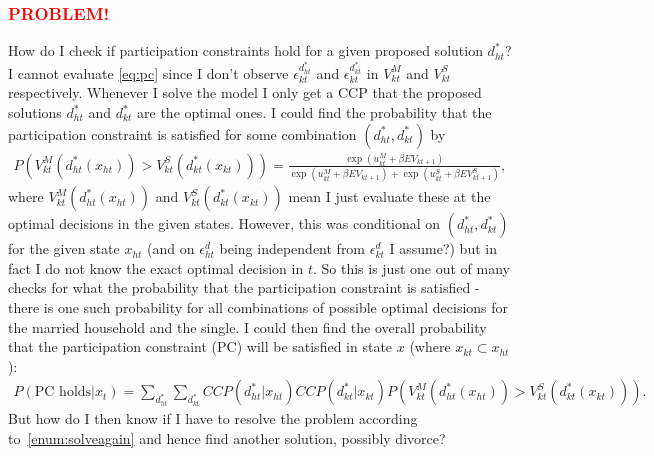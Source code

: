 \subsubsection{\textcolor{red}{PROBLEM!}} 
How do I check if participation constraints hold for a given proposed solution $d_{ht}^*$? I cannot evaluate \eqref{eq:pc} since I don't observe $\epsilon_{kt}^{d_{ht}^*}$ and $\epsilon_{kt}^{d_{kt}^*}$ in $V_{kt}^M$ and $V_{kt}^S$ respectively. Whenever I solve the model I only get a CCP that the proposed solutions $d_{ht}^*$ and $d_{kt}^*$ are the optimal ones. I could find the probability that the participation constraint is satisfied for some combination $(d_{ht}^*,d_{kt}^*)$ by
\begin{align*}
P(V_{kt}^M(d_{ht}^*(x_{ht}))>V_{kt}^S(d_{kt}^*(x_{kt})))=\frac{\exp{(u_{kt}^M+\beta EV_{kt+1})}}{\exp{(u_{kt}^M+\beta EV_{kt+1})}+\exp{(u_{kt}^S+\beta EV_{kt+1}^S)}},
\end{align*}
where $V_{kt}^M(d_{ht}^*(x_{ht}))$ and $V_{kt}^S(d_{kt}^*(x_{kt}))$ mean I just evaluate these at the optimal decisions in the given states. However, this was conditional on $(d_{ht}^*,d_{kt}^*)$ for the given state $x_{ht}$ (and on $\epsilon_{ht}^d$ being independent from $\epsilon_{kt}^d$ I assume?) but in fact I do not know the exact optimal decision in $t$. So this is just one out of many checks for what the probability that the participation constraint is satisfied - there is one such probability for all combinations of possible optimal decisions for the married household and the single. I could then find the overall probability that the participation constraint (PC) will be satisfied in state $x$ (where $x_{kt}\subset x_{ht}$):
\begin{align*}
P(\text{PC holds}|x_t)=\sum_{d_{ht}^*}{\sum_{d_{kt}^*}{CCP(d_{ht}^*|x_{ht})CCP(d_{kt}^*|x_{kt})P(V_{kt}^M(d_{ht}^*(x_{ht}))>V_{kt}^S(d_{kt}^*(x_{kt})))}}.
\end{align*}
But how do I then know if I have to resolve the problem according to~\cref{enum:solveagain} and hence find another solution, possibly divorce? 
%
%
